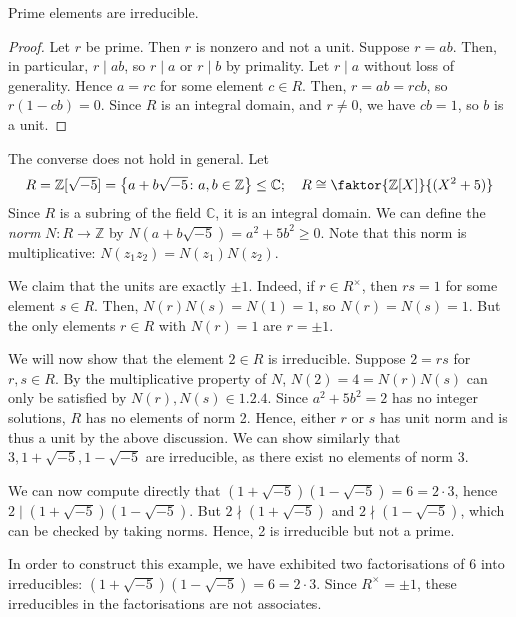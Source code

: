 \begin{lemma}
    Prime elements are irreducible.
\end{lemma}
\begin{proof}
    Let \( r \) be prime.
    Then \( r \) is nonzero and not a unit.
    Suppose \( r = ab \).
    Then, in particular, \( r \mid ab \), so \( r \mid a \) or \( r \mid b \) by primality.
    Let \( r \mid a \) without loss of generality.
    Hence \( a = rc \) for some element \( c \in R \).
    Then, \( r = ab = rcb \), so \( r(1-cb) = 0 \).
    Since \( R \) is an integral domain, and \( r \neq 0 \), we have \( cb = 1 \), so \( b \) is a unit.
\end{proof}
\begin{example}
    The converse does not hold in general.
    Let
    \[ R = \mathbb Z[\sqrt{-5}] = \qty{a+b\sqrt{-5} \colon a,b \in \mathbb Z} \leq \mathbb C;\quad R \cong \faktor{\mathbb Z[X]}{(X^2 + 5)} \]
    Since \( R \) is a subring of the field \( \mathbb C \), it is an integral domain.
    We can define the \textit{norm} \( N \colon R \to \mathbb Z \) by \( N(a+b\sqrt{-5}) = a^2 + 5b^2 \geq 0 \).
    Note that this norm is multiplicative: \( N(z_1 z_2) = N(z_1) N(z_2) \).

    We claim that the units are exactly \( \pm 1 \).
    Indeed, if \( r \in R^\times \), then \( rs = 1 \) for some element \( s \in R \).
    Then, \( N(r) N(s) = N(1) = 1 \), so \( N(r) = N(s) = 1 \).
    But the only elements \( r \in R \) with \( N(r) = 1 \) are \( r = \pm 1 \).

    We will now show that the element \( 2 \in R \) is irreducible.
    Suppose \( 2 = rs \) for \( r,s \in R \).
    By the multiplicative property of \( N \), \( N(2) = 4 = N(r) N(s) \) can only be satisfied by \( N(r), N(s) \in \qty{1,2,4} \).
    Since \( a^2 + 5b^2 = 2 \) has no integer solutions, \( R \) has no elements of norm 2.
    Hence, either \( r \) or \( s \) has unit norm and is thus a unit by the above discussion.
    We can show similarly that \( 3, 1 + \sqrt{-5}, 1 - \sqrt{-5} \) are irreducible, as there exist no elements of norm 3.

    We can now compute directly that \( (1 + \sqrt{-5})(1-\sqrt{-5}) = 6 = 2 \cdot 3 \), hence \( 2 \mid (1 + \sqrt{-5})(1-\sqrt{-5}) \).
    But \( 2 \nmid (1 + \sqrt{-5}) \) and \( 2 \nmid (1 - \sqrt{-5}) \), which can be checked by taking norms.
    Hence, 2 is irreducible but not a prime.

    In order to construct this example, we have exhibited two factorisations of 6 into irreducibles: \( (1 + \sqrt{-5})(1-\sqrt{-5}) = 6 = 2 \cdot 3 \).
    Since \( R^\times = \pm 1 \), these irreducibles in the factorisations are not associates.
\end{example}


